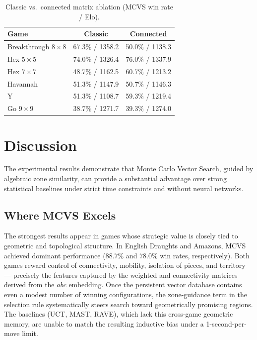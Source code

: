 \documentclass[11pt,a4paper]{article}
\theoremstyle{plain}
\theoremstyle{definition}
\begin{document}
\vspace{0.5em}

\begin{table}[H]
\centering
\caption{Classic vs.\ connected matrix ablation (MCVS win rate / Elo).}
\label{tab:classic-vs-connected}
\small
\begin{tabular}{@{}lcc@{}}
\toprule
\textbf{Game} & \textbf{Classic} & \textbf{Connected} \\
\midrule
Breakthrough $8\times8$ & 67.3\% / 1358.2 & 50.0\% / 1138.3 \\
Hex $5\times5$         & 74.0\% / 1326.4 & 76.0\% / 1337.9 \\
Hex $7\times7$         & 48.7\% / 1162.5 & 60.7\% / 1213.2 \\
Havannah               & 51.3\% / 1147.9 & 50.7\% / 1146.3 \\
Y                      & 51.3\% / 1108.7 & 59.3\% / 1219.4 \\
Go $9\times9$          & 38.7\% / 1271.7 & 39.3\% / 1274.0 \\
\bottomrule
\end{tabular}
\end{table}

\vspace{0.5em}

\section{Discussion}
\label{sec:discussion}

\vspace{0.5em}

The experimental results demonstrate that Monte Carlo Vector Search, guided by algebraic zone similarity, can provide a substantial advantage over strong statistical baselines under strict time constraints and without neural networks.

\vspace{0.5em}

\subsection{Where MCVS Excels}

\vspace{0.5em}

The strongest results appear in games whose strategic value is closely tied to geometric and topological structure. In English Draughts and Amazons, MCVS achieved dominant performance (88.7\% and 78.0\% win rates, respectively). Both games reward control of connectivity, mobility, isolation of pieces, and territory — precisely the features captured by the weighted and connectivity matrices derived from the \(abc\) embedding. Once the persistent vector database contains even a modest number of winning configurations, the zone-guidance term in the selection rule systematically steers search toward geometrically promising regions. The baselines (UCT, MAST, RAVE), which lack this cross-game geometric memory, are unable to match the resulting inductive bias under a 1-second-per-move limit.
\end{document}
